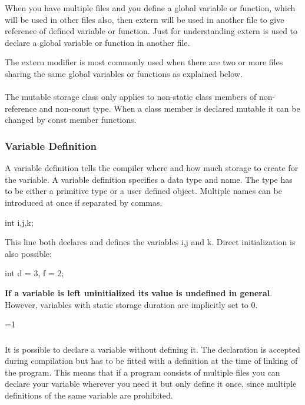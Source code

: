 \documentclass[10pt,a4paper]{scrartcl}
\gdef\conditionmacro{0}
\begin{document}
\begin{multicols*}{2}
When you have multiple files and you define a global variable or function, which will be used in other files also, then extern will be used in another file to give reference of defined variable or function. Just for understanding extern is used to declare a global variable or function in another file.

The extern modifier is most commonly used when there are two or more files sharing the same global variables or functions as explained below.

\paragraph{}

The mutable storage class only applies to non-static class members of non-reference and non-const type. When a class member is declared mutable it can be changed by const member functions.
\fi

\subsubsection{Variable Definition}
\label{sec:VariableDefinition}

A variable definition tells the compiler where and how much storage to create for the variable. A variable definition specifies a data type and name. The type has to be either a primitive type or a user defined object. Multiple names can be introduced at once if separated by commas.

\begin{TPCpp}
int i,j,k;
\end{TPCpp}

This line both declares and defines the variables i,j and k.
Direct initialization is also possible:

\begin{TPCpp}
int d = 3, f = 2;
\end{TPCpp}

\textbf{If a variable is left uninitialized its value is undefined in general}. However, variables with static storage duration are implicitly set to 0.

\ifnum\conditionmacro=1
\subsubsection{}
\label{sec:VariableDeclaration}

It is possible to declare a variable without defining it. The declaration is accepted during compilation but has to be fitted with a definition at the time of linking of the program. This means that if a program consists of multiple files you can declare your variable wherever you need it but only define it once, since multiple definitions of the same variable are prohibited.


\end{multicols*}
\end{document}
